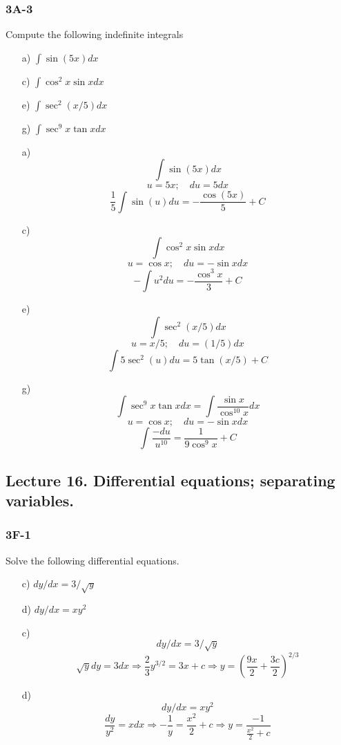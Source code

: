 \documentclass{article}
\begin{document}
\subsubsection{3A-3}
\begin{tcolorbox}
    Compute the following indefinite integrals
    \begin{itemize}
        \item[a)] $\int{\sin(5x)dx}$
        \item[c)] $\int{\cos^2{x}\sin{x}dx}$
        \item[e)] $\int{\sec^2{(x/5)}dx}$
        \item[g)] $\int{\sec^9{x}\tan{x}dx}$
    \end{itemize}
\end{tcolorbox}
\begin{itemize}
    \item[a)]
    \[ \int{\sin(5x)dx} \]
    \[ u = 5x; \quad du = 5dx \]
    \[ \frac{1}{5}\int{\sin(u)du} = -\frac{\cos(5x)}{5} + C \]

    \item[c)]
    \[ \int{\cos^2{x}\sin{x}dx} \]
    \[ u = \cos{x}; \quad du = -\sin{x}dx \]
    \[ -\int{u^2du} = -\frac{\cos^3{x}}{3} + C \]

    \item[e)]
    \[ \int{\sec^2{(x/5)}dx} \]
    \[ u = x/5; \quad du = (1/5)dx \]
    \[ \int{5\sec^2{(u)}du} = 5\tan{(x/5)} + C \]

    \item[g)] 
    \[ \int{\sec^9{x}\tan{x}dx} = \int{\frac{\sin{x}}{\cos^{10}{x}}dx} \]
    \[ u = \cos{x}; \quad du = -\sin{x}dx \]
    \[ \int{\frac{-du}{u^{10}}} = \frac{1}{9\cos^9{x}} + C \]
\end{itemize}

\subsection{Lecture 16. Differential equations; separating variables.}
\subsubsection{3F-1}
\begin{tcolorbox}
    Solve the following differential equations.
    \begin{itemize}
        \item[c)] $dy/dx = 3/\sqrt{y}$
        \item[d)] $dy/dx = xy^2$  
    \end{itemize}
\end{tcolorbox}
\begin{itemize}
    \item[c)]
    \[ dy/dx = 3/\sqrt{y} \]
    \[ \sqrt{y}dy = 3dx \Rightarrow \frac{2}{3}y^{3/2} = 3x + c \Rightarrow y = \left( \frac{9x}{2} + \frac{3c}{2} \right)^{2/3} \]
    \item[d)]
    \[ dy/dx = xy^2 \]
    \[ \frac{dy}{y^2} = xdx \Rightarrow -\frac{1}{y} = \frac{x^2}{2} + c \Rightarrow y = \frac{-1}{\frac{x^2}{2} + c} \]
\end{itemize}
\end{document}
